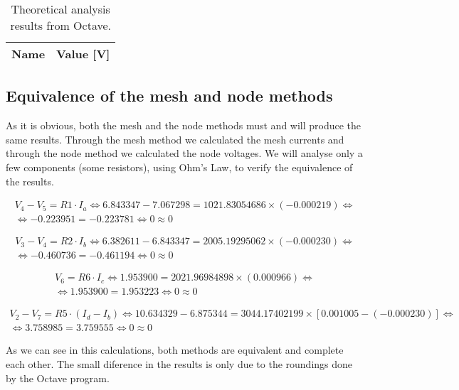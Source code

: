 \begin{table}[h]
  \centering
  \begin{tabular}{|l|r|}
    \hline    
    {\bf Name} & {\bf Value [V]} \\ \hline
     
  \end{tabular}
  \caption{Theoretical analysis results from Octave.}
  \label{tab:node}
\end{table}

\subsection{Equivalence of the mesh and node methods}

As it is obvious, both the mesh and the node methods must and will produce the same results. Through the mesh method we calculated the mesh currents and through the node method we calculated the node voltages. We will analyse only a few components (some resistors), using Ohm's Law, to verify the equivalence of the results.

\begin{gather*}
  V_4 - V_5=R1 \cdot I_a \Leftrightarrow 6.843347 - 7.067298=1021.83054686\times(-0.000219) \Leftrightarrow \\
  \Leftrightarrow -0.223951 = -0.223781 \Leftrightarrow 0 \approx 0 
\end{gather*}

\begin{gather*}
  V_3 - V_4=R2 \cdot I_b \Leftrightarrow 6.382611 - 6.843347=2005.19295062\times(-0.000230) \Leftrightarrow \\
  \Leftrightarrow -0.460736 = -0.461194 \Leftrightarrow 0 \approx 0 
\end{gather*}

\begin{gather*}
  V_6=R6 \cdot I_c \Leftrightarrow 1.953900=2021.96984898\times(0.000966) \Leftrightarrow \\
  \Leftrightarrow 1.953900 = 1.953223 \Leftrightarrow 0 \approx 0 
\end{gather*}

\begin{gather*}
  V_2 - V_7=R5 \cdot (I_d-I_b) \Leftrightarrow 10.634329 - 6.875344=3044.17402199\times[0.001005-(-0.000230)] \Leftrightarrow \\
  \Leftrightarrow 3.758985 = 3.759555 \Leftrightarrow 0 \approx 0 
\end{gather*}

As we can see in this calculations, both methods are equivalent and complete each other. The small diference in the results is only due to the roundings done by the Octave program.
